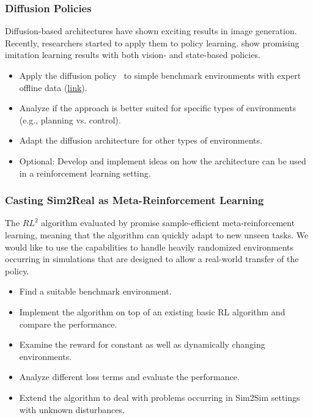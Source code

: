\documentclass[a4paper]{article}
\begin{document}
\subsubsection{Diffusion Policies}
Diffusion-based architectures have shown exciting results in image generation.
Recently, researchers started to apply them to policy learning. 
\citet{Chi2023DiffusionPolicy} show promising imitation learning results with both vision- and state-based policies.
\begin{itemize}
  \item Apply the diffusion policy~\cite{Chi2023DiffusionPolicy} to simple benchmark environments with expert offline data (\href{https://github.com/Farama-Foundation/Minari}{link}).
  \item Analyze if the approach is better suited for specific types of environments (e.g., planning vs. control).
  \item Adapt the diffusion architecture for other types of environments.
  \item Optional: Develop and implement ideas on how the architecture can be used in a reinforcement learning setting. 
\end{itemize}



\subsubsection{Casting Sim2Real as Meta-Reinforcement Learning}
The $RL^2$ algorithm evaluated by \citet{Yu2017} promise sample-efficient meta-reinforcement learning, meaning that the algorithm can quickly adapt to new unseen tasks. We would like to use the capabilities to handle heavily randomized environments occurring in simulations that are designed to allow a real-world transfer of the policy.
\begin{itemize}
  \item Find a suitable benchmark environment.
  \item Implement the algorithm on top of an existing basic RL algorithm and compare the performance.
  \item Examine the reward for constant as well as dynamically changing environments.
  \item Analyze different loss terms and evaluate the performance.
  \item Extend the algorithm to deal with problems occurring in Sim2Sim settings with unknown disturbances.
\end{itemize}
\end{document}
